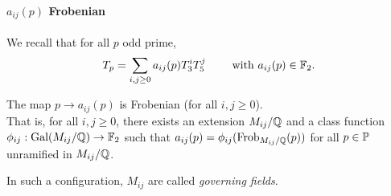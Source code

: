 \paragraph{$a_{ij}(p)$ Frobenian}

We recall that for all $p$ odd prime, 
$$
T_p = \sum_{i,j \geq 0} a_{ij}(p)T_3^iT_5^j
\qquad \text{ with } a_{ij}(p) \in \mathbb{F}_2.
$$
\begin{theorem}
	The map $p \to a_{ij}(p)$ is Frobenian (for all $i,j \geq 0$).\\
	That is, for all $i,j \geq 0$, there exists an extension $M_{ij}/\mathbb{Q}$ and a class function $\phi_{ij}: \text{Gal}(M_{ij}/\mathbb{Q}) \to \mathbb{F}_2$ such that $a_{ij}(p)=\phi_{ij}(\text{Frob}_{M_{ij}/\mathbb{Q}}(p))$ for all $p \in \mathbb{P}$ unramified in $M_{ij}/\mathbb{Q}$.
\end{theorem}
In such a configuration, $M_{ij}$ are called \textit{governing fields}.

%
%
%


















